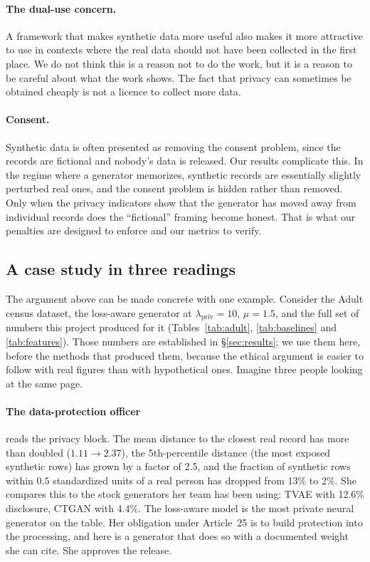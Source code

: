 \documentclass[11pt,a4paper]{article}
\newcommand{\lpriv}{\lambda_{\text{priv}}}
\begin{document}
\paragraph{The dual-use concern.}
A framework that makes synthetic data more useful also makes it more
attractive to use in contexts where the real data should not have been
collected in the first place. We do not think this is a reason not to do the
work, but it is a reason to be careful about what the work shows. The fact
that privacy can sometimes be obtained cheaply is not a licence to collect
more data.

\paragraph{Consent.}
Synthetic data is often presented as removing the consent problem, since the
records are fictional and nobody's data is released. Our results complicate
this. In the regime where a generator memorizes, synthetic records are
essentially slightly perturbed real ones, and the consent problem is hidden
rather than removed. Only when the privacy indicators show that the generator
has moved away from individual records does the ``fictional'' framing become
honest. That is what our penalties are designed to enforce and our metrics to
verify.

\subsection{A case study in three readings}
\label{sec:ethics:case}

The argument above can be made concrete with one example. Consider the Adult
census dataset, the loss-aware generator at $\lpriv = 10$, $\mu = 1.5$, and
the full set of numbers this project produced for it
(Tables~\ref{tab:adult}, \ref{tab:baselines} and \ref{tab:features}). Those
numbers are established in \S\ref{sec:results}; we use them here, before the
methods that produced them, because the ethical argument is easier to follow
with real figures than with hypothetical ones. Imagine three people looking
at the same page.

\paragraph{The data-protection officer} reads the privacy block. The mean
distance to the closest real record has more than doubled ($1.11 \to 2.37$),
the 5th-percentile distance (the most exposed synthetic rows) has grown by a
factor of 2.5, and the fraction of synthetic rows within $0.5$ standardized
units of a real person has dropped from 13\% to 2\%. She compares this to the
stock generators her team has been using: TVAE with 12.6\% disclosure, CTGAN
with 4.4\%. The loss-aware model is the most private neural generator on the
table. Her obligation under Article~25 is to build protection into the
processing, and here is a generator that does so with a documented weight she
can cite. She approves the release.
\end{document}
